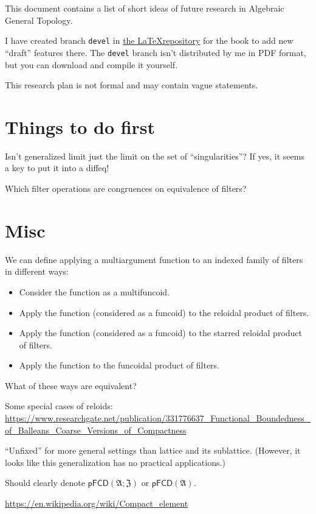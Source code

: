 \documentclass{amsart}
\begin{document}
This document contains a list of short ideas of future research in Algebraic
General Topology.

I have created branch \texttt{devel} in \href{https://bitbucket.org/portonv/algebraic-general-topology}{the \LaTeX repository} for the book
to add new ``draft'' features there. The \texttt{devel} branch isn't distributed by me in PDF format, but you can download and compile it yourself.

This research plan is not formal and may contain vague statements.

\section{Things to do first}

Isn't generalized limit just the limit on the set of ``singularities''? If yes, it seems a key to put it into a diffeq!

Which filter operations are congruences on
equivalence of filters?

\section{Misc}

We can define applying a multiargument function to an indexed family of filters in different ways:
\begin{itemize}
\item Consider the function as a multifuncoid.
\item Apply the function (considered as a funcoid) to the reloidal product of filters.
\item Apply the function (considered as a funcoid) to the starred reloidal product of filters.
\item Apply the function to the funcoidal product of filters.
\end{itemize}
What of these ways are equivalent?

Some special cases of reloids:
\url{https://www.researchgate.net/publication/331776637_Functional_Boundedness_of_Balleans_Coarse_Versions_of_Compactness}

``Unfixed'' for more general settings than lattice and its
sublattice. (However, it looks like this generalization has
no practical applications.)

Should clearly denote $\mathsf{pFCD}(\mathfrak{A};\mathfrak{Z})$ or $\mathsf{pFCD}(\mathfrak{A})$.

\url{https://en.wikipedia.org/wiki/Compact_element}
\end{document}
